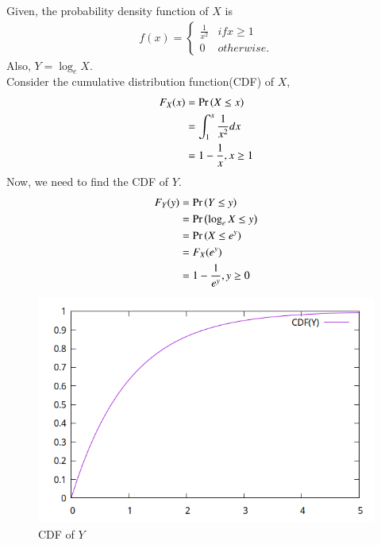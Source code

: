 \documentclass[journal,11pt]{IEEEtran}
\begin{document}
\begin{enumerate}
\solution
Given, the probability density function of $X$ is
\begin{align}
    f(x) = \begin{cases}
               \frac{1}{x^2} & if x \geq 1 \\
               0             & otherwise.
           \end{cases}
\end{align}
Also, $Y = \log_e X$.\\
Consider the cumulative distribution function(CDF) of $X$,
\begin{align}
    F_X(x) & = \Pr\left(X \leq x\right)                   \\
           & = \int_{1}^{x} \frac{1}{x^2} dx \\
           & = 1 - \frac{1}{x} , x \geq 1
\end{align}
Now, we need to find the CDF of $Y$.
\begin{align}
    F_Y(y) & = \Pr\left(Y \leq y\right) \\
           & = \Pr\left(\log_e X \leq y\right) \\
           & = \Pr\left(X \leq e^y\right) \\
           & = F_X(e^y) \\
           & = 1 - \frac{1}{e^y} , y \geq 0
\end{align}
\begin{figure}[!ht]
    \centering
    \includegraphics[width=\columnwidth]{./figs/cdf_plot.png}
    \caption{CDF of $Y$}
    \label{fig:cdf_plot}
\end{figure}



\end{enumerate}
\end{document}
